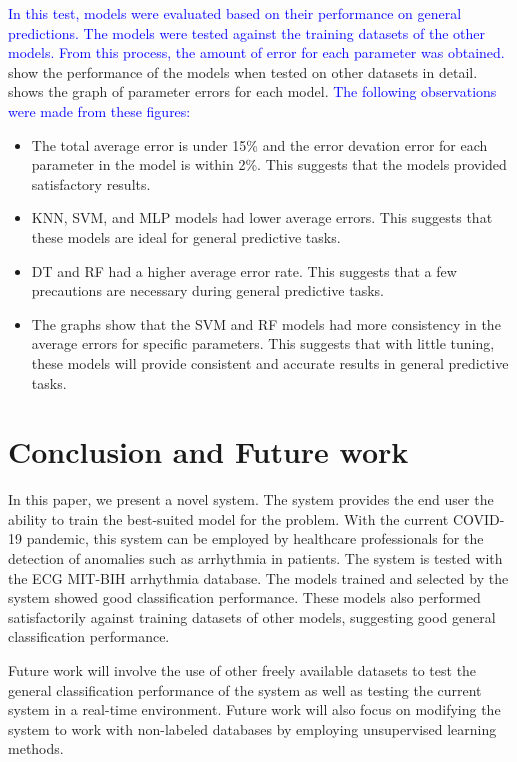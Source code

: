 \documentclass[a4paper,fleqn]{cas-dc}
\newcommand{\responsemodsm}[1]{\textcolor{blue}{#1}}
\begin{document}
\responsemodsm{In this test, models were evaluated based on their performance on general predictions. The models were tested against the training datasets of the other models. From this process, the amount of error for each parameter was obtained.}  show the performance of the models when tested on other datasets in detail.  shows the graph of parameter errors for each model. \responsemodsm{The following observations were made from these figures:}

\begin{itemize}
    \item The total average error is under 15\% and the error devation error for each parameter in the model is within 2\%. This suggests that the models provided satisfactory results.
    \item KNN, SVM, and MLP models had lower average errors. This suggests that these models are ideal for general predictive tasks.
    \item DT and RF had a higher average error rate. This suggests that a few precautions are necessary during general predictive tasks.
    \item The graphs show that the SVM and RF models had more consistency in the average errors for specific parameters. This suggests that with little tuning, these models will provide consistent and accurate results in general predictive tasks.
\end{itemize}

\FloatBarrier
\section{Conclusion and Future work} \label{sec:conclusion_and_future_work}
In this paper, we present a novel system. The system provides the end user the ability to train the best-suited model for the problem. With the current COVID-19 pandemic, this system can be employed by healthcare professionals for the detection of anomalies such as arrhythmia in patients. The system is tested with the ECG MIT-BIH arrhythmia database. The models trained and selected by the system showed good classification performance. These models also performed satisfactorily against training datasets of other models, suggesting good general classification performance.

Future work will involve the use of other freely available datasets to test the general classification performance of the system as well as testing the current system in a real-time environment. Future work will also focus on modifying the system to work with non-labeled databases by employing unsupervised learning methods.
\end{document}
